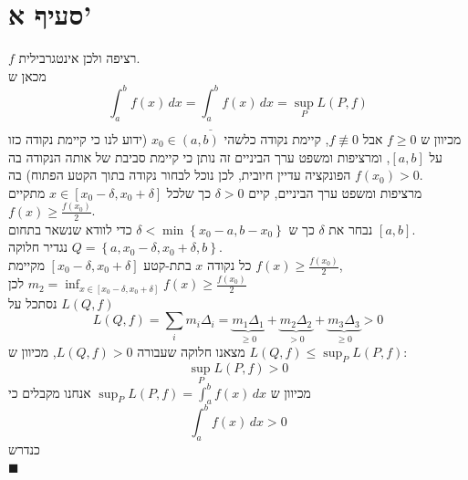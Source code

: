 \documentclass[12pt, titlepage]{article}
\begin{document}
\section*{סעיף א'}
$f$ רציפה ולכן אינטגרבילית.\\
מכאן ש
$$
	\int_{a}^{b} f\left( x \right)  \, dx = \underline{\int_{a}^{b}} f\left( x \right)  \, dx = \underset{ P }{ \sup }L\left( P,f \right) 
$$
מכיוון ש $f\geq 0$ אבל $f\not\equiv0$, קיימת נקודה כלשהי $x_{0}\in \left( a,b \right)$ (ידוע לנו כי קיימת נקודה כזו על $\left[ a,b \right]$, ומרציפות ומשפט ערך הביניים זה נותן כי קיימת סביבת של אותה הנקודה בה הפונקציה עדיין חיובית, לכן נוכל לבחור נקודה בתוך הקטע הפתוח)  בה $f\left( x_{0} \right)>0$.\\
מרציפות ומשפט ערך הביניים, קיים $\delta>0$ כך שלכל $x \in \left[ x_{0}-\delta,x_{0}+\delta \right]$ מתקיים $f\left( x \right)\geq \frac{f\left( x_{0} \right)}{2}$.\\
נבחר את $\delta$ כך ש $\delta<\min\left\{ x_{0}-a,b-x_{0} \right\}$ כדי לוודא שנשאר בתחום $\left[ a,b \right]$.\\
נגדיר חלוקה $Q=\left\{a,x_{0}-\delta,x_{0}+\delta,b \right\}$.\\
כל נקודה $x$ בתת-קטע $\left[x_{0}-\delta,x_{0}+\delta\right]$  מקיימת $f\left( x \right)\geq \frac{f\left( x_{0} \right)}{2}$,\\
לכן $m_{2}=\inf_{x \in \left[ x_{0}-\delta,x_{0}+\delta \right]}f\left( x \right)\geq \frac{f\left( x_{0} \right)}{2}$\\
נסתכל על $L\left( Q,f \right)$
$$
	L\left( Q,f \right) = \sum_{i}m_{i}\Delta_{i}= \underbrace{ m_{1}\Delta_{1} }_{ \geq 0 }+\underbrace{ m_{2}\Delta_{2} }_{ > 0 } + \underbrace{ m_{3}\Delta_{3} }_{ \geq 0 }> 0
$$
מצאנו חלוקה שעבורה $L\left( Q,f \right)>0$, מכיוון ש $L\left( Q,f \right)\leq\sup_{P}L\left( P,f \right)$:
$$
\sup_{P}L\left( P,f \right)>0
$$
מכיוון ש $\sup_{P}L\left( P,f \right)=\int_{a}^{b} f\left( x \right) \, dx$ אנחנו מקבלים כי
$$
	\boxed{\int_{a}^{b} f\left( x \right)  \, dx >0}
$$
כנדרש\\
$\blacksquare$
\end{document}
